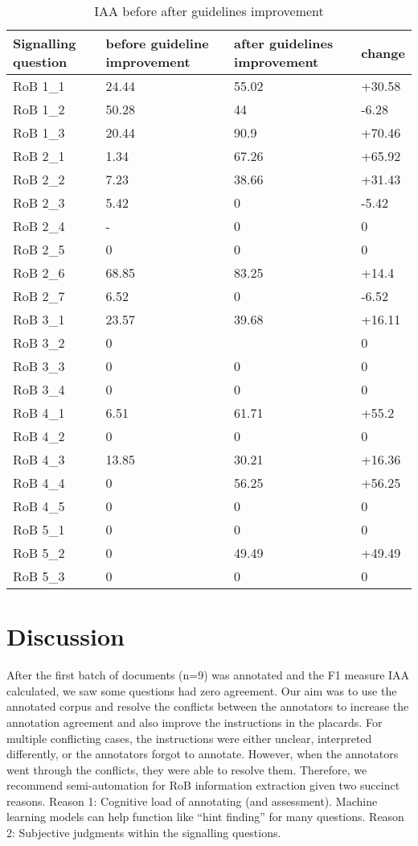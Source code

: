 \documentclass[sn-mathphys,Numbered]{sn-jnl}%
\theoremstyle{thmstyleone}%
\theoremstyle{thmstyletwo}%
\theoremstyle{thmstylethree}%
\begin{document}
\begin{table}[!ht]
    \caption{IAA before after guidelines improvement}
    \label{table:IAA_sq}
    \centering
    \begin{tabular}{llll}
    \hline
        Signalling question & before guideline improvement & after guidelines improvement & change \\
    \hline
        RoB 1\_1 & 24.44 & 55.02 & +30.58 \\ 
        RoB 1\_2 & 50.28 & 44 & -6.28 \\ 
        RoB 1\_3 & 20.44 & 90.9 & +70.46 \\ 
        RoB 2\_1 & 1.34 & 67.26 & +65.92 \\ 
        RoB 2\_2 & 7.23 & 38.66 & +31.43 \\ 
        RoB 2\_3 & 5.42 & 0 & -5.42 \\ 
        RoB 2\_4 & - & 0 & 0 \\ 
        RoB 2\_5 & 0 & 0 & 0 \\ 
        RoB 2\_6 & 68.85 & 83.25 & +14.4 \\ 
        RoB 2\_7 & 6.52 & 0 & -6.52 \\ 
        RoB 3\_1 & 23.57 & 39.68 & +16.11 \\ 
        RoB 3\_2 & 0 & ~ & 0 \\ 
        RoB 3\_3 & 0 & 0 & 0 \\ 
        RoB 3\_4 & 0 & 0 & 0 \\ 
        RoB 4\_1 & 6.51 & 61.71 & +55.2 \\ 
        RoB 4\_2 & 0 & 0 & 0 \\ 
        RoB 4\_3 & 13.85 & 30.21 & +16.36 \\ 
        RoB 4\_4 & 0 & 56.25 & +56.25 \\ 
        RoB 4\_5 & 0 & 0 & 0 \\ 
        RoB 5\_1 & 0 & 0 & 0 \\ 
        RoB 5\_2 & 0 & 49.49 & +49.49 \\ 
        RoB 5\_3 & 0 & 0 & 0 \\ \hline
    \end{tabular}
\end{table}
%
%
%
\section{Discussion}
\label{sec:discussion}
%
After the first batch of documents (n=9) was annotated and the F1 measure IAA calculated, we saw some questions had zero agreement.
Our aim was to use the annotated corpus and resolve the conflicts between the annotators to increase the annotation agreement and also improve the instructions in the placards.
For multiple conflicting cases, the instructions were either unclear, interpreted differently, or the annotators forgot to annotate.
However, when the annotators went through the conflicts, they were able to resolve them.
Therefore, we recommend semi-automation for RoB information extraction given two succinct reasons.
Reason 1: Cognitive load of annotating (and assessment). Machine learning models can help function like ``hint finding'' for many questions.
Reason 2: Subjective judgments within the signalling questions.
%
%
%
\end{document}
